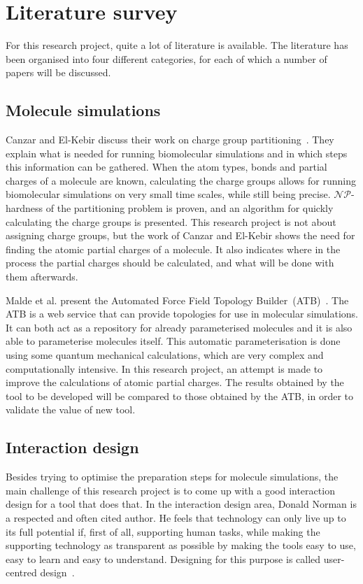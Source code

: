 \chapter{Literature survey}

For this research project, quite a lot of literature is available. The literature has been organised into four different categories, for each of which a number of papers will be discussed.


\section{Molecule simulations}

Canzar and El-Kebir discuss their work on charge group partitioning~\cite{canzar2012charge}. They explain what is needed for running biomolecular simulations and in which steps this information can be gathered. When the atom types, bonds and partial charges of a molecule are known, calculating the charge groups allows for running biomolecular simulations on very small time scales, while still being precise. $\mathcal{NP}$-hardness of the partitioning problem is proven, and an algorithm for quickly calculating the charge groups is presented. This research project is not about assigning charge groups, but the work of Canzar and El-Kebir shows the need for finding the atomic partial charges of a molecule. It also indicates where in the process the partial charges should be calculated, and what will be done with them afterwards.

Malde et al. present the Automated Force Field Topology Builder~(ATB)~\cite{malde2011automated}. The ATB is a web service that can provide topologies for use in molecular simulations. It can both act as a repository for already parameterised molecules and it is also able to parameterise molecules itself. This automatic parameterisation is done using some quantum mechanical calculations, which are very complex and computationally intensive. In this research project, an attempt is made to improve the calculations of atomic partial charges. The results obtained by the tool to be developed will be compared to those obtained by the ATB, in order to validate the value of new tool.


\section{Interaction design}

Besides trying to optimise the preparation steps for molecule simulations, the main challenge of this research project is to come up with a good interaction design for a tool that does that. In the interaction design area, Donald Norman is a respected and often cited author. He feels that technology can only live up to its full potential if, first of all, supporting human tasks, while making the supporting technology as transparent as possible by making the tools easy to use, easy to learn and easy to understand. Designing for this purpose is called user-centred design~\cite{norman2002design}.

